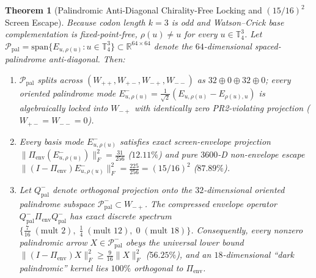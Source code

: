 \documentclass[11pt,a4paper]{article}
\newtheorem{theorem}{Theorem}
\newcommand{\Ttorus}{\mathbb{T}_4^3}
\newcommand{\Wpp}{W_{++}}
\newcommand{\Wpm}{W_{+-}}
\newcommand{\Wmp}{W_{-+}}
\newcommand{\Wmm}{W_{--}}
\newcommand{\Pienv}{\Pi_{\mathrm{env}}}
\begin{document}
\begin{theorem}[Palindromic Anti-Diagonal Chirality-Free Locking and $(15/16)^2$ Screen Escape]
\label{thm:pal_lock}
Because codon length $k=3$ is odd and Watson--Crick base complementation is fixed-point-free, $\rho(u)\neq u$ for every $u\in\Ttorus$. Let $\mathcal{P}_{\mathrm{pal}} = \mathrm{span}\{E_{u,\rho(u)} : u\in\Ttorus\} \subset \mathbb{R}^{64\times 64}$ denote the $64$-dimensional spaced-palindrome anti-diagonal. Then:
\begin{enumerate}[label=(\roman*),noitemsep,topsep=2pt]
  \item $\mathcal{P}_{\mathrm{pal}}$ splits across $(\Wpp,\Wpm,\Wmp,\Wmm)$ as $32 \oplus 0 \oplus 32 \oplus 0$; every oriented palindrome mode $E^-_{u,\rho(u)} = \frac{1}{\sqrt{2}}(E_{u,\rho(u)} - E_{\rho(u),u})$ is algebraically locked into $\Wmp$ with identically zero PR2-violating projection ($\Wpm = \Wmm = 0$).
  \item Every basis mode $E^-_{u,\rho(u)}$ satisfies exact screen-envelope projection $\|\Pienv(E^-_{u,\rho(u)})\|_F^2 = \frac{31}{256}$ ($12.11\%$) and pure $3600$-D non-envelope escape $\|(I-\Pienv)E^-_{u,\rho(u)}\|_F^2 = \frac{225}{256} = (15/16)^2$ ($87.89\%$). 
  \item Let $Q_{\mathrm{pal}}^-$ denote orthogonal projection onto the $32$-dimensional oriented palindrome subspace $\mathcal{P}_{\mathrm{pal}}^- \subset \Wmp$. The compressed envelope operator $Q_{\mathrm{pal}}^-\Pienv Q_{\mathrm{pal}}^-$ has exact discrete spectrum $\{\frac{7}{16}\;(\text{mult }2),\;\frac{1}{4}\;(\text{mult }12),\;0\;(\text{mult }18)\}$. Consequently, \emph{every} nonzero palindromic arrow $X\in\mathcal{P}_{\mathrm{pal}}^-$ obeys the universal lower bound $\|(I-\Pienv)X\|_F^2 \ge \frac{9}{16}\|X\|_F^2$ ($56.25\%$), and an $18$-dimensional ``dark palindromic'' kernel lies $100\%$ orthogonal to $\Pienv$.
\end{enumerate}
\end{theorem}
\end{document}
